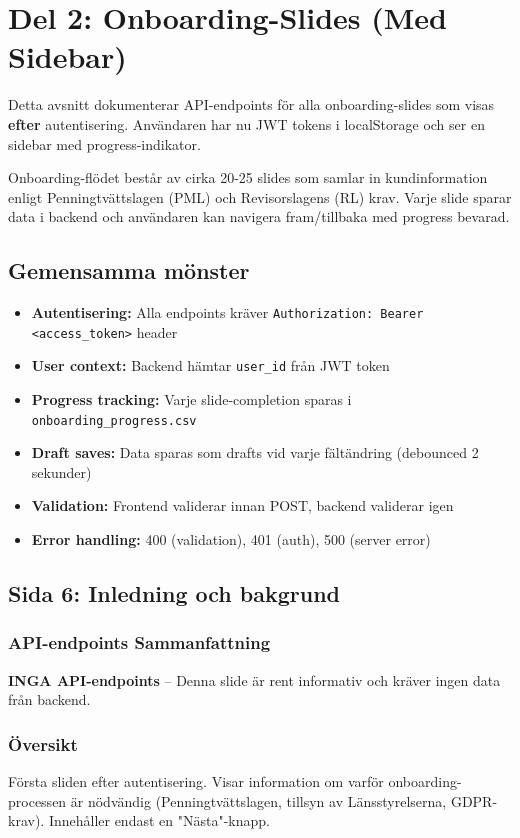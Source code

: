 \documentclass[12pt,a4paper]{article}
\begin{document}
\newpage
\section{Del 2: Onboarding-Slides (Med Sidebar)}

Detta avsnitt dokumenterar API-endpoints för alla onboarding-slides som visas \textbf{efter} autentisering. Användaren har nu JWT tokens i localStorage och ser en sidebar med progress-indikator.

Onboarding-flödet består av cirka 20-25 slides som samlar in kundinformation enligt Penningtvättslagen (PML) och Revisorslagens (RL) krav. Varje slide sparar data i backend och användaren kan navigera fram/tillbaka med progress bevarad.

\subsection{Gemensamma mönster}
\begin{itemize}[noitemsep]
  \item \textbf{Autentisering:} Alla endpoints kräver \texttt{Authorization: Bearer <access\_token>} header
  \item \textbf{User context:} Backend hämtar \texttt{user\_id} från JWT token
  \item \textbf{Progress tracking:} Varje slide-completion sparas i \texttt{onboarding\_progress.csv}
  \item \textbf{Draft saves:} Data sparas som drafts vid varje fältändring (debounced 2 sekunder)
  \item \textbf{Validation:} Frontend validerar innan POST, backend validerar igen
  \item \textbf{Error handling:} 400 (validation), 401 (auth), 500 (server error)
\end{itemize}

\newpage
\subsection{Sida 6: Inledning och bakgrund}

\subsubsection{API-endpoints Sammanfattning}
\textbf{INGA API-endpoints} -- Denna slide är rent informativ och kräver ingen data från backend.

\subsubsection{Översikt}
Första sliden efter autentisering. Visar information om varför onboarding-processen är nödvändig (Penningtvättslagen, tillsyn av Länsstyrelserna, GDPR-krav). Innehåller endast en "Nästa"-knapp.
\end{document}

